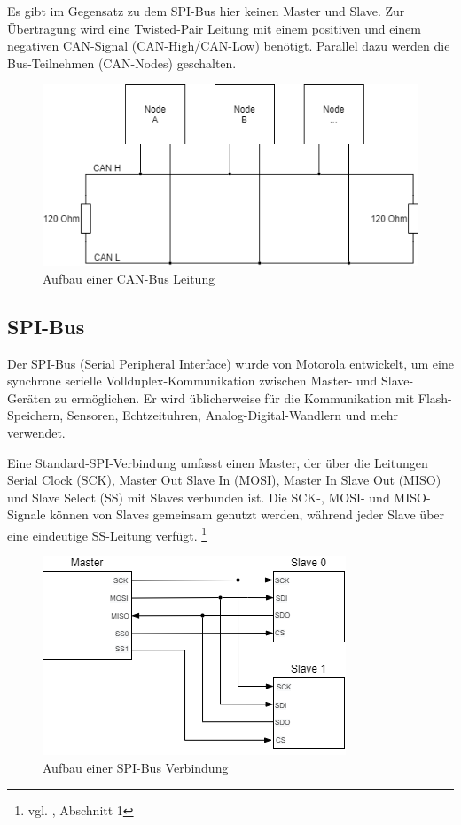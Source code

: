 Es gibt im Gegensatz zu dem SPI-Bus hier keinen Master und Slave. Zur Übertragung wird eine Twisted-Pair Leitung mit einem positiven und einem negativen CAN-Signal (CAN-High/CAN-Low) benötigt. Parallel dazu werden die Bus-Teilnehmen (CAN-Nodes) geschalten.

\begin{figure}[H]
	\begin{center}
		\includegraphics[scale=0.5]{figures/hcis/can_nodes.png}
		\caption{Aufbau einer CAN-Bus Leitung}
	\end{center}
\end{figure}

\subsection{SPI-Bus}

Der SPI-Bus (Serial Peripheral Interface) wurde von Motorola entwickelt, um eine synchrone serielle Vollduplex-Kommunikation zwischen Master- und Slave-Geräten zu ermöglichen. Er wird üblicherweise für die Kommunikation mit Flash-Speichern, Sensoren, Echtzeituhren, Analog-Digital-Wandlern und mehr verwendet.\\ \medskip

Eine Standard-SPI-Verbindung umfasst einen Master, der über die Leitungen Serial Clock (SCK), Master Out Slave In (MOSI), Master In Slave Out (MISO) und Slave Select (SS) mit Slaves verbunden ist. Die SCK-, MOSI- und MISO-Signale können von Slaves gemeinsam genutzt werden, während jeder Slave über eine eindeutige SS-Leitung verfügt. \footnote{vgl. \cite{spi}, Abschnitt 1}

\begin{figure}[H]
	\begin{center}
		\includegraphics[scale=0.5]{figures/hcis/spi_master_slave.png}
		\caption{Aufbau einer SPI-Bus Verbindung}
	\end{center}
\end{figure}

